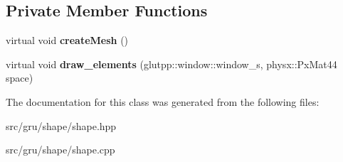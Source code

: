 \subsection*{\-Private \-Member \-Functions}
\begin{DoxyCompactItemize}
\item 
\hypertarget{classglutpp_1_1shape_1_1Empty_1_1Empty_a2c36151649529e17ad62ab4c7f333f61}{virtual void {\bfseries create\-Mesh} ()}\label{classglutpp_1_1shape_1_1Empty_1_1Empty_a2c36151649529e17ad62ab4c7f333f61}

\item 
\hypertarget{classglutpp_1_1shape_1_1Empty_1_1Empty_ac57912e5f2f78d17399fde0e502a824a}{virtual void {\bfseries draw\-\_\-elements} (glutpp\-::window\-::window\-\_\-s, physx\-::\-Px\-Mat44 space)}\label{classglutpp_1_1shape_1_1Empty_1_1Empty_ac57912e5f2f78d17399fde0e502a824a}

\end{DoxyCompactItemize}


\-The documentation for this class was generated from the following files\-:\begin{DoxyCompactItemize}
\item 
src/gru/shape/shape.\-hpp\item 
src/gru/shape/shape.\-cpp\end{DoxyCompactItemize}
